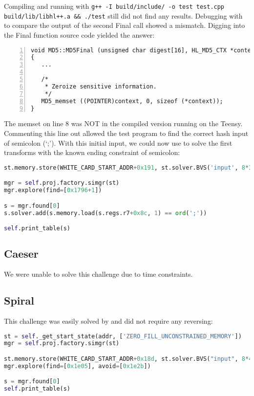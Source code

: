Compiling and running with \texttt{g++ -I build/include/ -o test test.cpp build/lib/libhl++.a \&\& ./test} still did not find any results. Debugging with \angr to compare the output of the second Final call showed a mismatch. Digging into the Final function source code yielded the answer:

\begin{lstlisting}[numbers=left,xleftmargin=1em]
void MD5::MD5Final (unsigned char digest[16], HL_MD5_CTX *context)
{
   ...

   /*
    * Zeroize sensitive information.
    */
   MD5_memset ((POINTER)context, 0, sizeof (*context));
}
\end{lstlisting}

The memset on line 8 was NOT in the compiled version running on the Teensy. Commenting this line out allowed the test program to find the correct hash input of semicolon (`;'). With this initial input, we could now use \angr to solve the first transforms with the known ending constraint of semicolon:

\begin{lstlisting}[language=python]
st.memory.store(WHITE_CARD_START_ADDR+0x191, st.solver.BVS('input', 8*3))

mgr = self.proj.factory.simgr(st)
mgr.explore(find=[0x1796+1])

s = mgr.found[0]
s.solver.add(s.memory.load(s.regs.r7+0x8c, 1) == ord(';'))

self.print_table(s)
\end{lstlisting}

\subsection{Caeser}
We were unable to solve this challenge due to time constraints.

\subsection{Spiral}
This challenge was easily solved by \angr and did not require any reversing:

\begin{lstlisting}[language=python]
st = self._get_start_state(addr, ['ZERO_FILL_UNCONSTRAINED_MEMORY'])
mgr = self.proj.factory.simgr(st)

st.memory.store(WHITE_CARD_START_ADDR+0x18d, st.solver.BVS("input", 8*4))
mgr.explore(find=[0x1e05], avoid=[0x1e2b])

s = mgr.found[0]
self.print_table(s)
\end{lstlisting}

